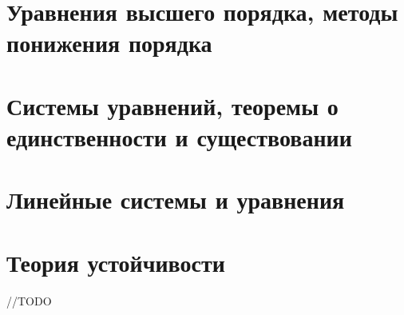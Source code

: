 \documentclass[12pt, a4paper]{article}
\begin{document}
\section{Уравнения высшего порядка, методы понижения порядка}



\section{Системы уравнений, теоремы о единственности и существовании}

\section{Линейные системы и уравнения}


\section{Теория устойчивости}

//TODO
\end{document}
